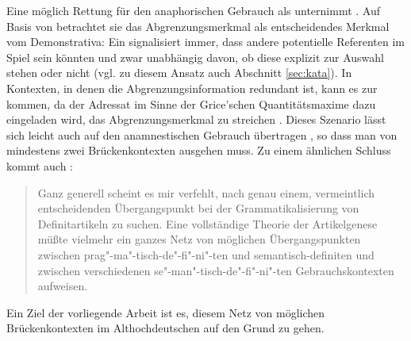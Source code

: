 Eine möglich Rettung für den anaphorischen  Gebrauch als  unternimmt  
\textcite{Schlachter2015}. Auf Basis von \textcite{Bisle-Muller1991} betrachtet sie das Abgrenzungsmerkmal als entscheidendes Merkmal vom Demonstrativa: Ein  signalisiert immer, dass andere potentielle Referenten im Spiel sein könnten und zwar unabhängig davon, ob diese explizit zur Auswahl stehen oder nicht (vgl. zu diesem Ansatz auch  Abschnitt \ref{sec:kata}). In Kontexten, in denen die Abgrenzungsinformation redundant ist, kann es zur  kommen, da der Adressat im Sinne der Grice'schen Quantitätsmaxime \parencite[Mache deinen Beitrag nicht informativer als notwendig,][]{Grice1975} dazu eingeladen wird, das Abgrenzungsmerkmal zu streichen \parencite{Schlachter2015}. Dieses Szenario lässt sich leicht auch auf den anamnestischen  Gebrauch übertragen \parencite[s. hierzu][]{Schlachter2015}, so dass man von mindestens zwei Brückenkontexten  ausgehen muss. Zu einem ähnlichen Schluss kommt auch \textcite{Himmelmann1997}: 

\blockcquote[96]{Himmelmann1997}{
Ganz generell scheint es mir verfehlt, nach genau einem, vermeintlich entscheidenden
Übergangspunkt bei der Grammatikalisierung  von Definitartikeln  zu suchen. Eine vollständige
Theorie der Artikelgenese müßte vielmehr ein ganzes Netz von möglichen Übergangspunkten
zwischen prag"-ma"-tisch-de"-fi"-ni"-ten und semantisch-definiten  und zwischen verschiedenen
se"-man"-tisch-de"-fi"-ni"-ten Gebrauchskontexten aufweisen.} 

\noindent
Ein Ziel der vorliegende Arbeit ist es, diesem Netz von möglichen Brückenkontexten  im Althochdeutschen auf den Grund zu gehen. 

